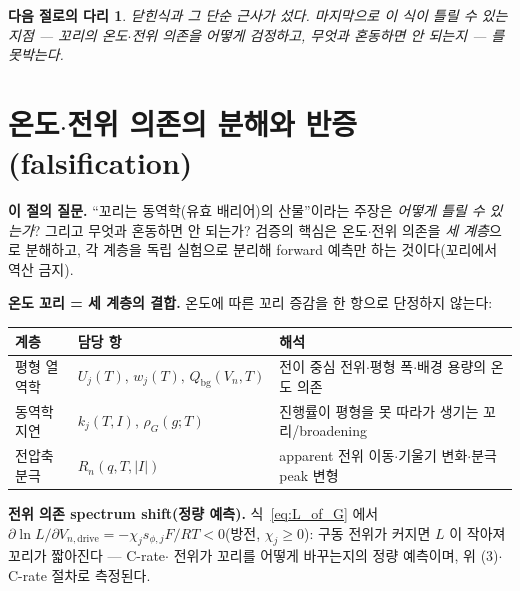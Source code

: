 \documentclass[11pt,a4paper]{article}
\newtheorem*{bridgebox}{다음 절로의 다리}
\newcommand{\drive}{\mathrm{drive}}
\newcommand{\bg}{\mathrm{bg}}
\begin{document}
\begin{bridgebox}
닫힌식과 그 단순 근사가 섰다. 마지막으로 이 식이 \emph{틀릴 수 있는} 지점 — 꼬리의 온도$\cdot$전위 의존을
어떻게 검정하고, 무엇과 혼동하면 안 되는지 — 를 못박는다.
\end{bridgebox}

\section{온도$\cdot$전위 의존의 분해와 반증(falsification)}\label{sec:falsify}
\textbf{이 절의 질문.} ``꼬리는 동역학(유효 배리어)의 산물''이라는 주장은 \emph{어떻게 틀릴 수 있는가}? 그리고
무엇과 혼동하면 안 되는가? 검증의 핵심은 온도$\cdot$전위 의존을 \emph{세 계층}으로 분해하고, 각 계층을 독립
실험으로 분리해 forward 예측만 하는 것이다(꼬리에서 역산 금지).

\textbf{온도 꼬리 = 세 계층의 결합.} 온도에 따른 꼬리 증감을 한 항으로 단정하지 않는다:
\begin{longtable}{p{} p{} p{}}
\toprule 계층 & 담당 항 & 해석 \\ \midrule \endhead
평형 열역학 & $U_j(T),\,w_j(T),\,Q_\bg(V_n,T)$ & 전이 중심 전위$\cdot$평형 폭$\cdot$배경 용량의 온도 의존 \\
동역학 지연 & $k_j(T,I),\,\rho_G(g;T)$ & 진행률이 평형을 못 따라가 생기는 꼬리/broadening \\
전압축 분극 & $R_n(q,T,|I|)$ & apparent 전위 이동$\cdot$기울기 변화$\cdot$분극 peak 변형 \\
\bottomrule
\end{longtable}

\textbf{전위 의존 spectrum shift(정량 예측).} 식~\eqref{eq:L_of_G} 에서 $\partial\ln L/\partial V_{n,\drive}
=-\chi_j s_{\phi,j}F/RT<0$(방전, $\chi_j\ge0$): 구동 전위가 커지면 $L$ 이 작아져 꼬리가 짧아진다 — C-rate$\cdot$
전위가 꼬리를 어떻게 바꾸는지의 정량 예측이며, 위 (3)$\cdot$C-rate 절차로 측정된다.
\end{document}

